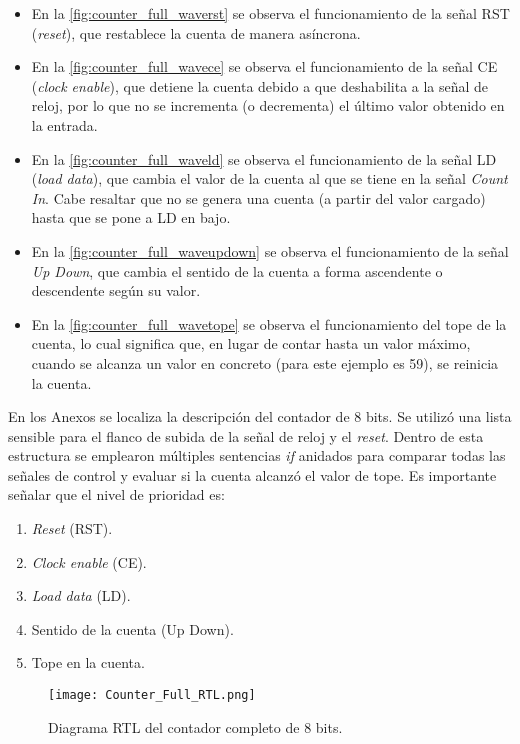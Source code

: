 \begin{itemize}
	\item En la \autoref{fig:counter_full_waverst} se observa el funcionamiento de la señal RST (\textit{reset}), que restablece la cuenta de manera asíncrona.
	\item En la \autoref{fig:counter_full_wavece} se observa el funcionamiento de la señal CE (\textit{clock enable}), que detiene la cuenta debido a que deshabilita a la señal de reloj, por lo que no se incrementa (o decrementa) el último valor obtenido en la entrada.
	\item En la \autoref{fig:counter_full_waveld} se observa el funcionamiento de la señal LD (\textit{load data}), que cambia el valor de la cuenta al que se tiene en la señal \textit{Count In}. Cabe resaltar que no se genera una cuenta (a partir del valor cargado) hasta que se pone a LD en bajo.
	\item En la \autoref{fig:counter_full_waveupdown} se observa el funcionamiento de la señal \textit{Up Down}, que cambia el sentido de la cuenta a forma ascendente o descendente según su valor.
	\item En la \autoref{fig:counter_full_wavetope} se observa el funcionamiento del tope de la cuenta, lo cual significa que, en lugar de contar hasta un valor máximo, cuando se alcanza un valor en concreto (para este ejemplo es 59), se reinicia la cuenta.
\end{itemize}

En los Anexos se localiza la descripción del contador de 8 bits. Se utilizó una lista sensible para el flanco de subida de la señal de reloj y el \textit{reset}. Dentro de esta estructura se emplearon múltiples sentencias \textit{if} anidados para comparar todas las señales de control y evaluar si la cuenta alcanzó el valor de tope. Es importante señalar que el nivel de prioridad es: 
\begin{enumerate}
	\item \textit{Reset} (RST).
	\item \textit{Clock enable} (CE).
	\item \textit{Load data} (LD).
	\item Sentido de la cuenta (Up Down).
	\item Tope en la cuenta.
\end{enumerate}

\begin{figure}[ht]
	\centering
	\texttt{[image: Counter\_Full\_RTL.png]}
	\caption{Diagrama RTL del contador completo de 8 bits. \label{fig:counter_full_rtl}}
\end{figure}

